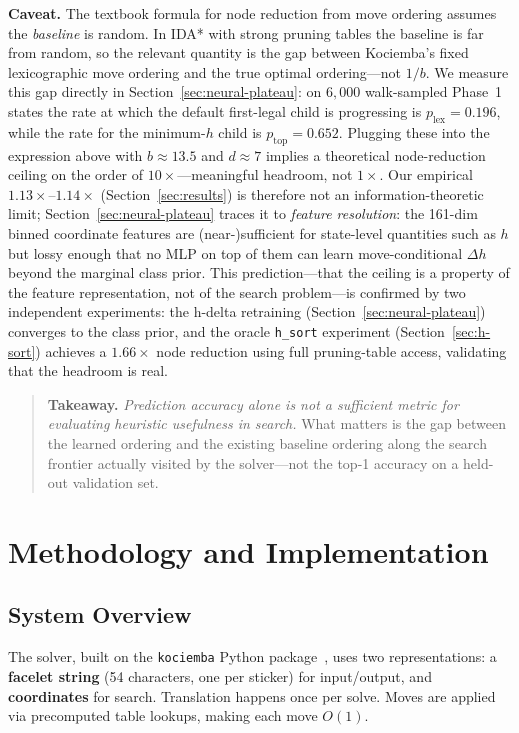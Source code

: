 \documentclass[graybox]{svmult}
\begin{document}
\textbf{Caveat.} The textbook formula for node reduction from move ordering assumes the \emph{baseline} is random. In IDA* with strong pruning tables the baseline is far from random, so the relevant quantity is the gap between Kociemba's fixed lexicographic move ordering and the true optimal ordering---not $1/b$. We measure this gap directly in Section~\ref{sec:neural-plateau}: on $6{,}000$ walk-sampled Phase~1 states the rate at which the default first-legal child is progressing is $p_{\text{lex}} = 0.196$, while the rate for the minimum-$h$ child is $p_{\text{top}} = 0.652$. Plugging these into the expression above with $b \approx 13.5$ and $d \approx 7$ implies a theoretical node-reduction ceiling on the order of $10\times$---meaningful headroom, not $1\times$. Our empirical $1.13{\times}$--$1.14{\times}$ (Section~\ref{sec:results}) is therefore not an information-theoretic limit; Section~\ref{sec:neural-plateau} traces it to \emph{feature resolution}: the 161-dim binned coordinate features are (near-)sufficient for state-level quantities such as $h$ but lossy enough that no MLP on top of them can learn move-conditional $\Delta h$ beyond the marginal class prior. This prediction---that the ceiling is a property of the feature representation, not of the search problem---is confirmed by two independent experiments: the h-delta retraining (Section~\ref{sec:neural-plateau}) converges to the class prior, and the oracle \texttt{h\_sort} experiment (Section~\ref{sec:h-sort}) achieves a $1.66\times$ node reduction using full pruning-table access, validating that the headroom is real.

\begin{quote}
\textbf{Takeaway.} \emph{Prediction accuracy alone is not a sufficient metric for evaluating heuristic usefulness in search.} What matters is the gap between the learned ordering and the existing baseline ordering along the search frontier actually visited by the solver---not the top-1 accuracy on a held-out validation set.
\end{quote}

\section{Methodology and Implementation}
\label{sec:method}

\subsection{System Overview}
The solver, built on the \texttt{kociemba} Python package~\cite{muodov}, uses two representations: a \textbf{facelet string} (54 characters, one per sticker) for input/output, and \textbf{coordinates} for search. Translation happens once per solve. Moves are applied via precomputed table lookups, making each move $O(1)$.
\end{document}
